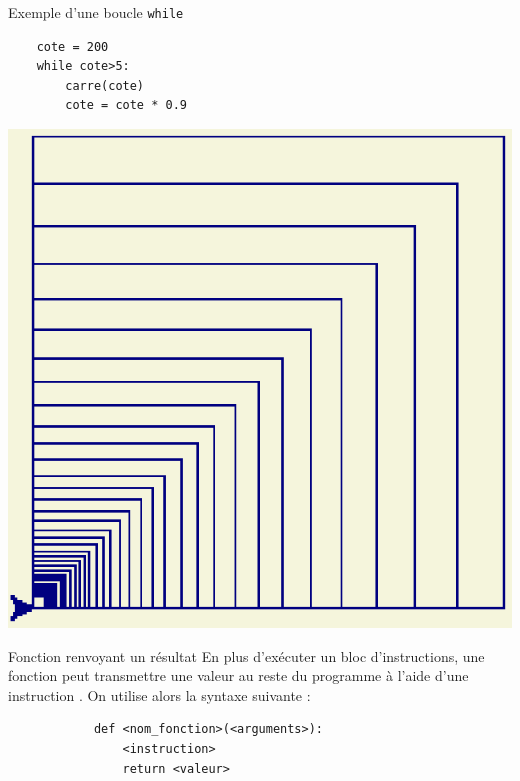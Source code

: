 \documentclass[10pt]{beamer}
\begin{document}
\begin{frame}[fragile]
	\mframe{\Python}
	\begin{exampleblock}{Exemple d'une boucle {\tt while}}
		\begin{lstlisting}
 	cote = 200
	while cote>5:
    	carre(cote)
     	cote = cote * 0.9
		\end{lstlisting}
		\begin{center}
			\includegraphics[scale=0.3]{ex_cours.eps}
		\end{center}
	\end{exampleblock}
\end{frame}

\begin{frame}[fragile]
	\mframe{\Python}
	\begin{alertblock}{Fonction renvoyant un résultat}
		En plus d'exécuter un bloc d'instructions, une fonction peut transmettre une valeur au reste du programme à l'aide d'une instruction .
		On utilise alors la syntaxe suivante : 
		\begin{lstlisting}
			def <nom_fonction>(<arguments>):
				<instruction>
				return <valeur>
			\end{lstlisting}
	\end{alertblock}
\end{frame}
\end{document}
